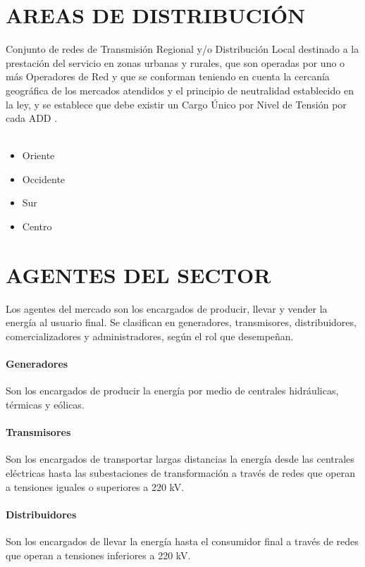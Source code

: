 \documentclass[a5paper]{book}%
\begin{document}
\section{AREAS DE DISTRIBUCIÓN}
Conjunto de redes de Transmisión Regional y/o Distribución Local
destinado a la prestación del servicio en zonas urbanas y rurales, que
son operadas por uno o más Operadores de Red y que se conforman
teniendo en cuenta la cercanía geográfica de los mercados atendidos y
el principio de neutralidad establecido en la ley, y se establece que
debe existir un Cargo Único por Nivel de Tensión por cada ADD \cite{CREG1332013}.\\\\
\begin{itemize}
\item Oriente
\item  Occidente
\item  Sur 
                            \item  Centro
\end{itemize}

\section{AGENTES DEL SECTOR}
Los agentes del mercado son los encargados de producir, llevar y vender la energía al usuario final. Se clasifican en generadores, transmisores, distribuidores, comercializadores y administradores, según el rol que desempeñan.

\paragraph{Generadores}

Son los encargados de producir la energía por medio de centrales hidráulicas, térmicas y eólicas.
\paragraph{Transmisores}

Son los encargados de transportar largas distancias la energía desde las centrales eléctricas hasta las subestaciones de transformación a través de redes que operan a tensiones iguales o superiores a 220 kV.
\paragraph{Distribuidores}

Son los encargados de llevar la energía hasta el consumidor final a través de redes que operan a tensiones inferiores a 220 kV.
\end{document}
